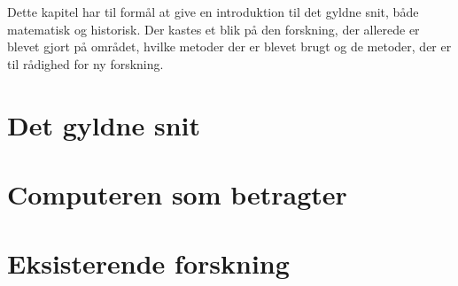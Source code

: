 \textsf{
Dette kapitel har til formål at give en introduktion til det gyldne snit,
både matematisk og historisk. Der kastes et blik på den forskning, der
allerede er blevet gjort på området, hvilke metoder der er blevet brugt
og de metoder, der er til rådighed for ny forskning.
}

\section{Det gyldne snit\label{section_gyldne_snit}}


\section{Computeren som betragter\label{section_computer_betragter}}


\section{Eksisterende forskning\label{section_forskning}}


